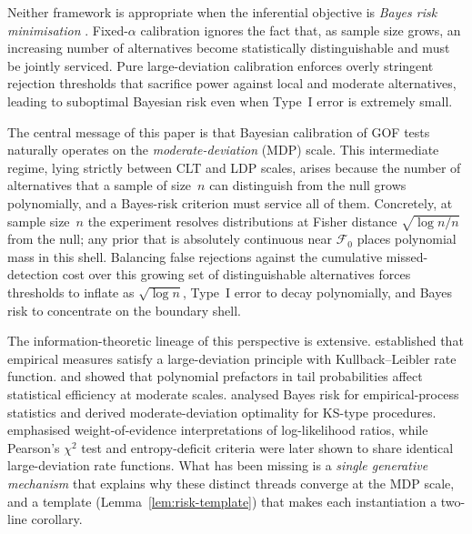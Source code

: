 \documentclass[11pt]{article}
\newcommand{\calF}{\mathcal{F}}
\newcommand{\1}{\mathbf{1}}
\theoremstyle{plain}
\theoremstyle{definition}
\theoremstyle{remark}
\begin{document}
Neither framework is appropriate when the inferential objective is \emph{Bayes risk minimisation} \citep[cf.][]{Berger1985, LeCam1986}.
Fixed-$\alpha$ calibration ignores the fact that, as sample size grows, an increasing number of alternatives become statistically distinguishable and must be jointly serviced.
Pure large-deviation calibration enforces overly stringent rejection thresholds that sacrifice power against local and moderate alternatives, leading to suboptimal Bayesian risk even when Type~I error is extremely small.

The central message of this paper is that Bayesian calibration of GOF tests naturally operates on the \emph{moderate-deviation} (MDP) scale.
This intermediate regime, lying strictly between CLT and LDP scales, arises because the number of alternatives that a sample of size~$n$ can distinguish from the null grows polynomially, and a Bayes-risk criterion must service all of them.
Concretely, at sample size~$n$ the experiment resolves distributions at Fisher distance $\sqrt{\log n/n}$ from the null; any prior that is absolutely continuous near $\calF_0$ places polynomial mass in this shell.
Balancing false rejections against the cumulative missed-detection cost over this growing set of distinguishable alternatives forces thresholds to inflate as $\sqrt{\log n}$, Type~I error to decay polynomially, and Bayes risk to concentrate on the boundary shell.

The information-theoretic lineage of this perspective is extensive.
\citet{Sanov1957} established that empirical measures satisfy a large-deviation principle with Kullback--Leibler rate function.
\citet{Bahadur1960} and \citet{BahadurRao1960} showed that polynomial prefactors in tail probabilities affect statistical efficiency at moderate scales.
\citet{RubinSethuraman1965a, RubinSethuraman1965b} analysed Bayes risk for empirical-process statistics and derived moderate-deviation optimality for KS-type procedures.
\citet{Good1955} emphasised weight-of-evidence interpretations of log-likelihood ratios, while Pearson's $\chi^2$ test and entropy-deficit criteria \citep{Jaynes1957} were later shown to share identical large-deviation rate functions.
What has been missing is a \emph{single generative mechanism} that explains why these distinct threads converge at the MDP scale, and a template (Lemma~\ref{lem:risk-template}) that makes each instantiation a two-line corollary.
\end{document}
